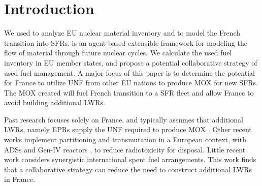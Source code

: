 
\section{Introduction}
We used \Cyclus \cite{huff_fundamental_2016} to analyze
 \gls{EU} nuclear material inventory and to model the French transition into
 \glspl{SFR}. \Cyclus is an agent-based extensible
framework for modeling the flow of material through future nuclear cycles.
We calculate the used fuel
inventory in \gls{EU} member states, and propose a potential collaborative
strategy of used fuel management.
A major focus of this paper is to determine the potential for France to utilize
\gls{UNF} from other \gls{EU} nations to produce \gls{MOX} for new \glspl{SFR}.
The \gls{MOX} created will fuel French transition to a \gls{SFR} fleet
and allow France to avoid building additional \glspl{LWR}.

Past research focuses solely on France, and typically assumes that additional \glspl{LWR},
namely \glspl{EPR} supply the \gls{UNF} required to produce \gls{MOX} \cite{carre_overview_2009, martin_symbiotic_2017, freynet_multiobjective_2016}.
Other recent works implement partitioning and transmutation
in a European context, with \glspl{ADS} and Gen-IV reactors \cite{fazio_study_2013},
to reduce radiotoxicity for disposal.
Little recent work considers synergistic international spent fuel arrangements.
This work finds that a collaborative strategy can reduce the
need to construct additional \glspl{LWR} in France.
